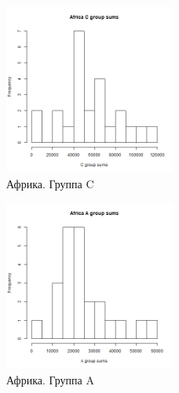 \begin{figure}[!htb]
    \centering
    \includegraphics[width=0.5\textwidth]{fig/Africa_C.png}
    \caption{Африка. Группа C}
\end{figure}
\newpage
\begin{figure}[!htb]
    \centering
    \includegraphics[width=0.5\textwidth]{fig/Africa_A.png}
    \caption{Африка. Группа A}
\end{figure}

